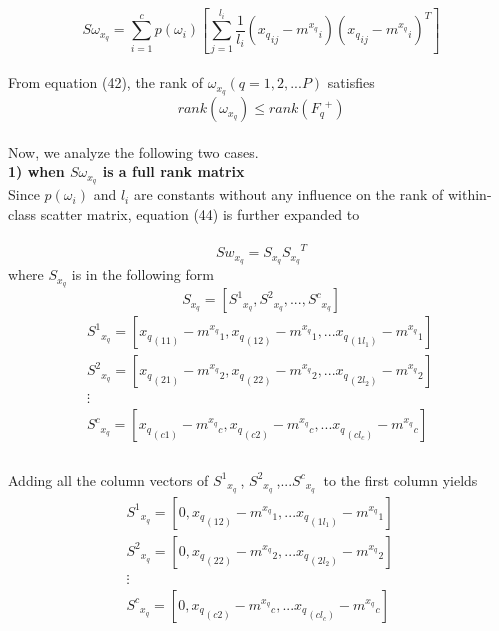 \documentclass[journal]{IEEEtran}
\begin{document}
\begin{equation}\ S{\omega_{{x_q}}} = \sum\limits_{i = 1}^c {p({\omega _{i}})\left[ {\sum\limits_{j = 1}^{{l_i}} {\frac{1}{{{l_i}}}({x_q}_{ij} - {m^{{x_q}}}_i){{({x_q}_{ij} - {m^{{x_q}}}_i)}^T}} } \right]} \end{equation}\\\indent From equation (42), the rank of $\omega _{{x_q}} (q=1,2,...P)$ satisfies
\begin{equation} \ rank(\omega _{{x_q}}) \le rank({F_q}^ +) \end{equation}\\
Now, we analyze the following two cases.\\

\textbf{1) when ${S{\omega_{{{x_q}}}}} $ is a full rank matrix}\\\indent
Since $ p({\omega _i})$ and ${l_i}$ are constants without any influence on the rank of within-class scatter matrix, equation (44) is further expanded to \\\
\begin{equation} \ S{w_{x_q}} = {S_{x_q}}{S_{x_q}}^T \end{equation}
where ${S_{x_q}}$ is in the following form
\begin{equation}\ S{_{{x_q}}} = \left[ {{S^1}_{{x_q}}, {S^2}_{{x_q}}, ..., {S^c}_{{x_q}}} \right]
\end{equation}
\begin{equation} \begin{array}{*{20}{c}}
   {{S^1}_{{x_q}} = \left[ {{x_q}_{(11)} - {m^{{x_q}}}_1,{x_{q}}_{(12)} - {m^{{x_q}}}_1,...{x_{q}}_{(1{l_1})} - {m^{{x_q}}}_1} \right]}  \\
   {{S^2}_{{x_q}} = \left[ {{x_q}_{(21)} - {m^{{x_q}}}_2,{x_{q}}_{(22)} - {m^{{x_q}}}_2,...{x_q}_{(2{l_2})} - {m^{{x_q}}}_2} \right]}  \\
    \vdots   \\
   {{S^c}_{{x_q}} = \left[ {{x_{q}}_{(c1)} - {m^{{x_q}}}_c,{x_q}_{(c2)} - {m^{{x_q}}}_c,...{x_{q}}_{(c{l_c})} - {m^{{x_q}}}_c} \right]}  \\
\end{array}
 \end{equation}
\\\indent Adding all the column vectors of $ {S^1}_{{x_q}}\ $, $ {S^2}_{{x_q}}\ $,...$ {S^c}_{{x_q}}\ $ to the first column yields
\begin{equation} \begin{array}{*{20}{c}}
   {{S^1}_{{x_q}} = \left[ {0,{x_{q}}_{(12)} - {m^{{x_q}}}_1,...{x_{q}}_{(1{l_1})} - {m^{{x_q}}}_1} \right]}  \\
   {{S^2}_{{x_q}} = \left[ {0,{x_{q}}_{(22)} - {m^{{x_q}}}_2,...{x_q}_{(2{l_2})} - {m^{{x_q}}}_2} \right]}  \\
    \vdots   \\
   {{S^c}_{{x_q}} = \left[ {0,{x_q}_{(c2)} - {m^{{x_q}}}_c,...{x_{q}}_{(c{l_c})} - {m^{{x_q}}}_c} \right]}  \\
\end{array}
 \end{equation}
\end{document}
